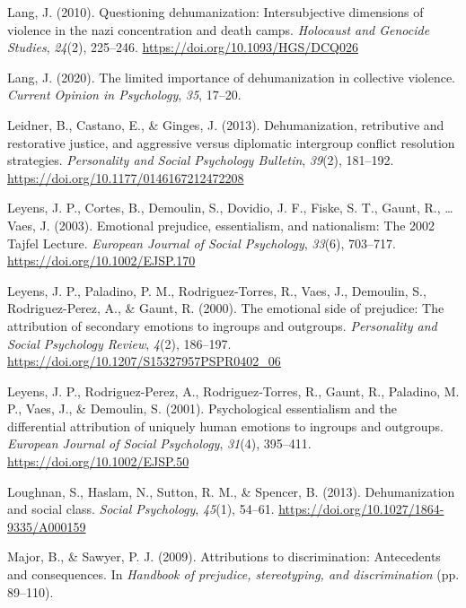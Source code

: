 \documentclass[
]{article}
\newlength{\cslhangindent}
\newlength{\cslentryspacingunit} %
\newenvironment{CSLReferences}[2] %
 {%
  \setlength{\parindent}{0pt}
  \ifodd #1
  \let\oldpar\par
  \def\par{\hangindent=\cslhangindent\oldpar}
  \fi
  \setlength{\parskip}{#2\cslentryspacingunit}
 }%
 {}
\begin{document}
\begin{CSLReferences}{1}{0}
\leavevmode{}%
Lang, J. (2010). Questioning dehumanization: Intersubjective dimensions of violence in the nazi concentration and death camps. \emph{Holocaust and Genocide Studies}, \emph{24}(2), 225--246. \url{https://doi.org/10.1093/HGS/DCQ026}

\leavevmode{}%
Lang, J. (2020). The limited importance of dehumanization in collective violence. \emph{Current Opinion in Psychology}, \emph{35}, 17--20.

\leavevmode{}%
Leidner, B., Castano, E., \& Ginges, J. (2013). Dehumanization, retributive and restorative justice, and aggressive versus diplomatic intergroup conflict resolution strategies. \emph{Personality and Social Psychology Bulletin}, \emph{39}(2), 181--192. \url{https://doi.org/10.1177/0146167212472208}

\leavevmode{}%
Leyens, J. P., Cortes, B., Demoulin, S., Dovidio, J. F., Fiske, S. T., Gaunt, R., \ldots{} Vaes, J. (2003). Emotional prejudice, essentialism, and nationalism: The 2002 {Tajfel Lecture}. \emph{European Journal of Social Psychology}, \emph{33}(6), 703--717. \url{https://doi.org/10.1002/EJSP.170}

\leavevmode{}%
Leyens, J. P., Paladino, P. M., Rodriguez-Torres, R., Vaes, J., Demoulin, S., Rodriguez-Perez, A., \& Gaunt, R. (2000). The emotional side of prejudice: The attribution of secondary emotions to ingroups and outgroups. \emph{Personality and Social Psychology Review}, \emph{4}(2), 186--197. \url{https://doi.org/10.1207/S15327957PSPR0402_06}

\leavevmode{}%
Leyens, J. P., Rodriguez-Perez, A., Rodriguez-Torres, R., Gaunt, R., Paladino, M. P., Vaes, J., \& Demoulin, S. (2001). Psychological essentialism and the differential attribution of uniquely human emotions to ingroups and outgroups. \emph{European Journal of Social Psychology}, \emph{31}(4), 395--411. \url{https://doi.org/10.1002/EJSP.50}

\leavevmode{}%
Loughnan, S., Haslam, N., Sutton, R. M., \& Spencer, B. (2013). Dehumanization and social class. \emph{Social Psychology}, \emph{45}(1), 54--61. \url{https://doi.org/10.1027/1864-9335/A000159}

\leavevmode{}%
Major, B., \& Sawyer, P. J. (2009). Attributions to discrimination: Antecedents and consequences. In \emph{Handbook of prejudice, stereotyping, and discrimination} (pp. 89--110).


\end{CSLReferences}
\end{document}
